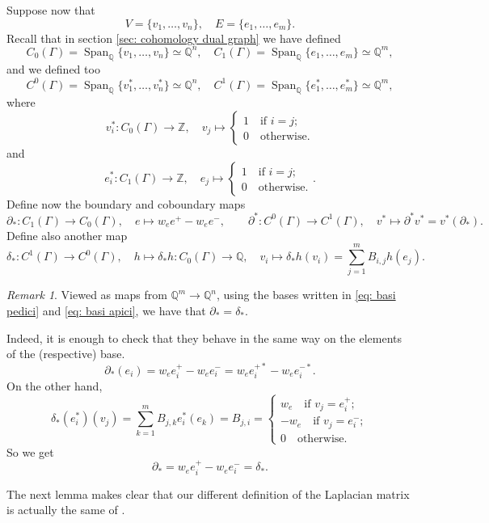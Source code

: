 \documentclass[a4paper,12 pt,titlepage,twoside]{book}
\newcommand{\numberset}{\mathbb}
\newcommand{\Z}{\numberset{Z}}
\newcommand{\Q}{\numberset{Q}}
\DeclareMathOperator{\Span}{Span}
\theoremstyle{plain}
\theoremstyle{theorem}
\theoremstyle{definition}
\theoremstyle{remark}
\newtheorem{oss}[thm]{Remark}
\begin{document}
	Suppose now that $$V = \{v_1, \dots, v_n\}, \quad E = \{e_1, \dots, e_m\}.$$ Recall that in section \ref{sec: cohomology dual graph} we have defined \begin{equation}\label{eq: basi pedici} C_0(\Gamma) = \Span_\Q\{v_1, \dots, v_n\} \simeq \Q^n, \quad  C_1(\Gamma) = \Span_\Q\{e_1, \dots, e_m\}\simeq \Q^m,\end{equation} and we defined too \begin{equation}\label{eq: basi apici} C^0(\Gamma) = \Span_\Q\{v_1^*, \dots, v_n^*\}\simeq \Q^n, \quad C^1(\Gamma) = \Span_\Q\{e_1^*, \dots, e_m^*\}\simeq \Q^m,\end{equation} where $$v_i^* \colon C_0(\Gamma) \rightarrow \Z, \quad v_j \mapsto \begin{cases}
	1 \quad \text{if } i=j;\\ 0 \quad \text{otherwise}.
	\end{cases}$$ and $$e_i^* \colon C_1(\Gamma) \rightarrow \Z, \quad e_j \mapsto \begin{cases}
	1 \quad \text{if } i=j;\\ 0 \quad \text{otherwise}.
	\end{cases}.$$
	Define now the boundary and coboundary maps $$\partial_* \colon C_1(\Gamma) \rightarrow C_0(\Gamma), \quad e \mapsto w_ee^+-w_ee^-, \qquad \partial^* \colon C^0(\Gamma) \rightarrow C^1(\Gamma), \quad v^* \mapsto \partial^*v^* = v^*(\partial_*).$$ Define also another map $$ \delta_* \colon C^1(\Gamma) \rightarrow C^0(\Gamma), \quad h \mapsto \delta_*h \colon C_0(\Gamma) \rightarrow \Q, \quad v_i \mapsto \delta_*h(v_i)=\sum_{j = 1}^m B_{i,j} h(e_j).$$
	\begin{oss}
		Viewed as maps from $\Q^m \rightarrow \Q^n$, using the bases written in \ref{eq: basi pedici} and \ref{eq: basi apici}, we have that $\partial_* = \delta_*.$
		
		Indeed, it is enough to check that they behave in the same way on the elements of the (respective) base. $$\partial_*(e_i) = w_ee_i^+ - w_ee_i^- = w_ee_i^{+*} - w_ee_i^{-*}.$$ On the other hand, $$\delta_*(e_i^*)(v_j) = \sum_{k = 1}^m B_{j,k} e_i^*(e_k) = B_{j,i} = \begin{cases}
		w_e \quad \text{if } v_j=e_i^+;\\ -w_e \quad \text{if } v_j = e_i^-; \\ 0 \quad \text{otherwise}.
		\end{cases}$$ So we get $$\partial_* = w_ee_i^+ - w_ee_i^- = \delta_*.$$
	\end{oss}
	The next lemma makes clear that our different definition of the Laplacian matrix is actually the same of \cite{MR3488379}.
\end{document}
